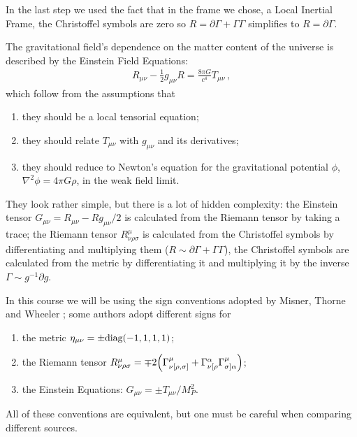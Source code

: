 \documentclass[main.tex]{subfiles}
\begin{document}
In the last step we used the fact that in the frame we chose, a Local Inertial Frame, the Christoffel symbols are zero so \(R = \partial \Gamma  + \Gamma \Gamma \) simplifies to \(R = \partial \Gamma \). 

The gravitational field's dependence on the matter content of the universe is described by the Einstein Field Equations: 
%
\begin{align}
R_{\mu \nu } - \frac{1}{2} g_{\mu \nu } R = \frac{8 \pi G}{c^{4}} T_{\mu \nu } 
\,,
\end{align}
%
which follow from the assumptions that 
\begin{enumerate}
  \item they should be a local tensorial equation;
  \item they should relate \(T_{\mu \nu } \) with \(g_{\mu \nu }\) and its derivatives;
  \item they should reduce to Newton's equation for the gravitational potential \(\phi \), \(\nabla^2 \phi = 4 \pi G \rho \), in the weak field limit.
\end{enumerate}

They look rather simple, but there is a lot of hidden complexity: the Einstein tensor \(G_{\mu \nu } = R_{\mu \nu } - R g_{\mu \nu } / 2\) is  calculated from the Riemann tensor by taking a trace; the Riemann tensor \(R^{\mu }_{\nu \rho \sigma } \) is calculated from the Christoffel symbols by differentiating and multiplying them (\(R \sim \partial \Gamma  + \Gamma \Gamma \)), the Christoffel symbols are calculated from the metric by differentiating it and multiplying it by the inverse \(\Gamma \sim g^{-1} \partial g\).  

In this course we will be using the sign conventions adopted by Misner, Thorne and Wheeler \cite[page 3]{misnerGravitation1973}; some authors adopt different signs for 
\begin{enumerate}
  \item the metric \(\eta_{\mu \nu } = \pm \text{diag}\qty(-1, 1, 1, 1)\);
  \item the Riemann tensor \(R^{\mu }_{\nu \rho \sigma } = \mp 2 \qty(\Gamma^{\mu }_{\nu [\rho , \sigma] } + \Gamma^{\alpha }_{\nu [\rho }\Gamma^{\mu }_{\sigma ] \alpha })\);
  \item the Einstein Equations: \(G_{\mu \nu } = \pm T_{\mu \nu } / M_P^2\).
\end{enumerate} 

All of these conventions are equivalent, but one must be careful when comparing different sources.
\end{document}
